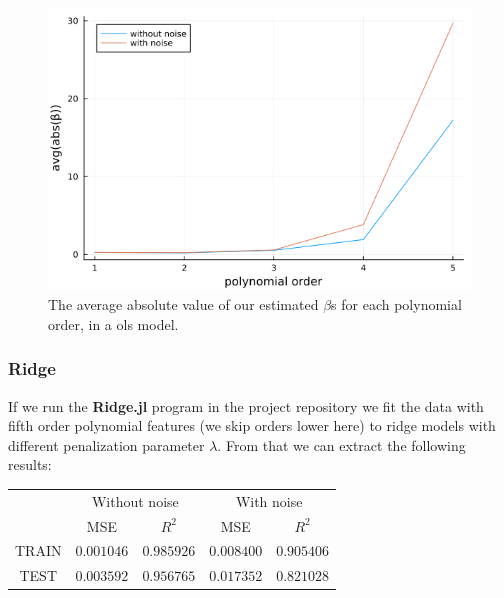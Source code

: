 \documentclass{article}
\begin{document}
\begin{figure}
    \centerline{\includegraphics[scale=0.5]{linearregression_beta_size}}
    \caption{The average absolute value of our estimated $\beta$s for each polynomial order, in a ols model.}
    \label{beta-abs-sum}
\end{figure}

\subsubsection{Ridge}
If we run the \textbf{Ridge.jl} program in the project repository
\cite{githubrepoproject1} we fit the data with fifth order polynomial features
(we skip orders lower here) to ridge models with different penalization
parameter $\lambda$. From that we can extract the following
results:\\
\begin{tabular}{| c | c | c | c | c |}
          & \multicolumn{2}{|c|}{Without noise} & \multicolumn{2}{|c|}{With noise}                           \\
          & MSE                                 & $R^2$                            & MSE        & $R^2$      \\
    TRAIN & $0.001046$                          & $0.985926$                       & $0.008400$ & $0.905406$ \\
    TEST  & $0.003592$                          & $0.956765$                       & $0.017352$ & $0.821028$ \\
\end{tabular}
\end{document}
